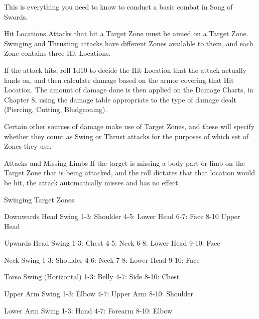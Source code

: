 \documentclass[oneside,11pt,english]{book}
\begin{document}
 

 

 

This is everything you need to know to conduct a basic combat in Song of Swords. 

 

 

Hit Locations 
Attacks that hit a Target Zone must be aimed on a Target Zone. Swinging and Thrusting attacks have 
different Zones available to them, and each Zone contains three Hit Locations. 

 

If the attack hits, roll 1d10 to decide the Hit Location that the attack actually lands on, and then calculate 
damage based on the armor covering that Hit Location. 
The amount of damage done is then applied on the Damage Charts, in Chapter 8, using the damage 
table appropriate to the type of damage dealt (Piercing, Cutting, Bludgeoning). 

 

Certain other sources of damage make use of Target Zones, and these will specify whether they count as 
Swing or Thrust attacks for the purposes of which set of Zones they use. 

 

Attacks and Missing Limbs 
If the target is missing a body part or limb on the Target Zone that is being attacked, and the roll dictates 
that that location would be hit, the attack automatically misses and has no effect. 

 

 


Swinging Target Zones 

 

Downwards Head Swing 
1-3: Shoulder 
4-5: Lower Head 
6-7: Face 
8-10 Upper Head 

 

Upwards Head Swing 
1-3: Chest 
4-5: Neck 
6-8: Lower Head 
9-10: Face 

 

Neck Swing 
1-3: Shoulder 
4-6: Neck 
7-8: Lower Head 
9-10: Face 

 

Torso Swing (Horizontal) 
1-3: Belly 
4-7: Side 
8-10: Chest 

 

Upper Arm Swing 
1-3: Elbow 
4-7: Upper Arm 
8-10: Shoulder 

 

Lower Arm Swing 
1-3: Hand 
4-7: Forearm 
8-10: Elbow 
\end{document}
